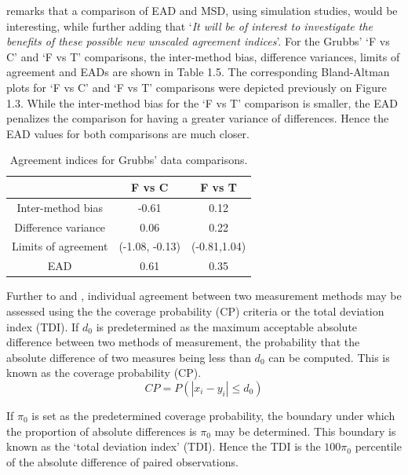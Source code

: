 \documentclass[12pt, a4paper]{report}
\theoremstyle{plain}
\theoremstyle{definition}
\theoremstyle{remark}
\begin{document}
\citet{Barnhart} remarks that a comparison of EAD and MSD, using
simulation studies, would be interesting, while further adding
that `\textit{It will be of interest to investigate the benefits of these
	possible new unscaled agreement indices}'. For the Grubbs' `F vs C' and `F vs T' comparisons, the inter-method bias, difference variances, limits of agreement and EADs are shown
in Table 1.5. The corresponding Bland-Altman plots for `F vs C' and `F vs T' comparisons were depicted previously on Figure 1.3. While the inter-method bias for the `F vs T' comparison is smaller, the EAD penalizes the comparison for having a greater variance of differences. Hence the EAD values for both comparisons are much closer.
\begin{table}[ht]
	\begin{center}
		\begin{tabular}{|c||c|c|}
			\hline
			& F vs C & F vs T  \\\hline
			\hline
			Inter-method bias & -0.61 & 0.12 \\ \hline
			Difference variance & 0.06 & 0.22  \\ \hline 
			Limits of agreement & (-1.08,	-0.13) & (-0.81,1.04) \\ \hline
			EAD & 0.61 & 0.35  \\ \hline 
			
		\end{tabular}
		\caption{Agreement indices for Grubbs' data comparisons.}
	\end{center}
\end{table}

Further to  \citet{lin2000} and \citet{lin2002}, individual agreement between two measurement methods may be
assessed using the the coverage probability (CP) criteria or the total deviation index (TDI). If $d_{0}$ is predetermined as the maximum acceptable absolute difference between two methods of measurement, the probability that the absolute difference of two measures being less than $d_{0}$ can be computed. This is known as the coverage probability (CP).
\begin{equation}
CP = P(|x_{i} - y_{i}| \leq d_{0})
\end{equation}

If $\pi_{0}$ is set as the predetermined coverage probability, the
boundary under which the proportion of absolute differences is
$\pi_{0}$ may be determined. This boundary is known as the `total
deviation index' (TDI). Hence the TDI is the $100\pi_{0}$
percentile of the absolute difference of paired observations.
\end{document}
